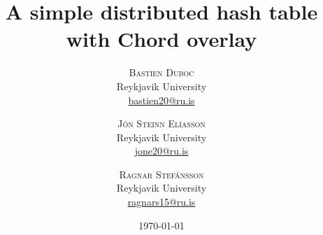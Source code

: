 \setlength{\droptitle}{-4\baselineskip}
\pretitle{\begin{center}\Huge\bfseries}
    \posttitle{\end{center}}
\title{A simple distributed hash table\\ with Chord overlay}
\author{
\textsc{Bastien Duboc} \\[1ex]
\normalsize Reykjavik University \\
\normalsize \href{mailto:bastien20@ru.is}{bastien20@ru.is}
\and
\textsc{Jón Steinn Elíasson} \\[1ex]
\normalsize Reykjavik University \\
\normalsize \href{mailto:jone20@ru.is}{jone20@ru.is}
\and
\textsc{Ragnar Stefánsson}\\[1ex]
\normalsize Reykjavik University \\
\normalsize \href{mailto:ragnars15@ru.is}{ragnars15@ru.is}
}

\date{\today}
\renewcommand{\maketitlehookd}{

\begin{abstract}
{\noindent }
\end{abstract}
}